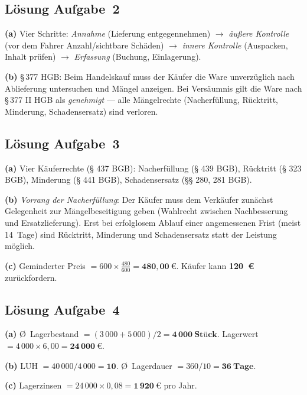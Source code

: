\documentclass[11pt, a4paper]{article}
\begin{document}
\subsection*{Lösung Aufgabe~2}

\begin{loesung}
\textbf{(a)} Vier Schritte: \emph{Annahme} (Lieferung entgegennehmen) $\to$ \emph{äußere
Kontrolle} (vor dem Fahrer Anzahl/sichtbare Schäden) $\to$ \emph{innere Kontrolle}
(Auspacken, Inhalt prüfen) $\to$ \emph{Erfassung} (Buchung, Einlagerung).

\textbf{(b)} §\,377 HGB: Beim Handelskauf muss der Käufer die Ware unverzüglich
nach Ablieferung untersuchen und Mängel anzeigen. Bei Versäumnis gilt die Ware
nach §\,377 II HGB als \emph{genehmigt} --- alle Mängelrechte (Nacherfüllung,
Rücktritt, Minderung, Schadensersatz) sind verloren.
\end{loesung}

\subsection*{Lösung Aufgabe~3}

\begin{loesung}
\textbf{(a)} Vier Käuferrechte (§ 437 BGB): Nacherfüllung (§ 439 BGB), Rücktritt
(§ 323 BGB), Minderung (§ 441 BGB), Schadensersatz (§§ 280, 281 BGB).

\textbf{(b)} \emph{Vorrang der Nacherfüllung}: Der Käufer muss dem Verkäufer
zunächst Gelegenheit zur Mängelbeseitigung geben (Wahlrecht zwischen Nachbesserung
und Ersatzlieferung). Erst bei erfolglosem Ablauf einer angemessenen Frist
(meist 14~Tage) sind Rücktritt, Minderung und Schadensersatz statt der Leistung
möglich.

\textbf{(c)} Geminderter Preis $= 600 \times \frac{480}{600} = \mathbf{480{,}00~€}$.
Käufer kann \textbf{120~€} zurückfordern.
\end{loesung}

\subsection*{Lösung Aufgabe~4}

\begin{loesung}
\textbf{(a)} Ø~Lagerbestand $= (3\,000 + 5\,000) / 2 = \mathbf{4\,000~\text{Stück}}$.
Lagerwert $= 4\,000 \times 6{,}00 = \mathbf{24\,000~€}$.

\textbf{(b)} LUH $= 40\,000 / 4\,000 = \mathbf{10}$. Ø~Lagerdauer
$= 360 / 10 = \mathbf{36~\text{Tage}}$.

\textbf{(c)} Lagerzinsen $= 24\,000 \times 0{,}08 = \mathbf{1\,920~€}$ pro Jahr.
\end{loesung}
\end{document}
